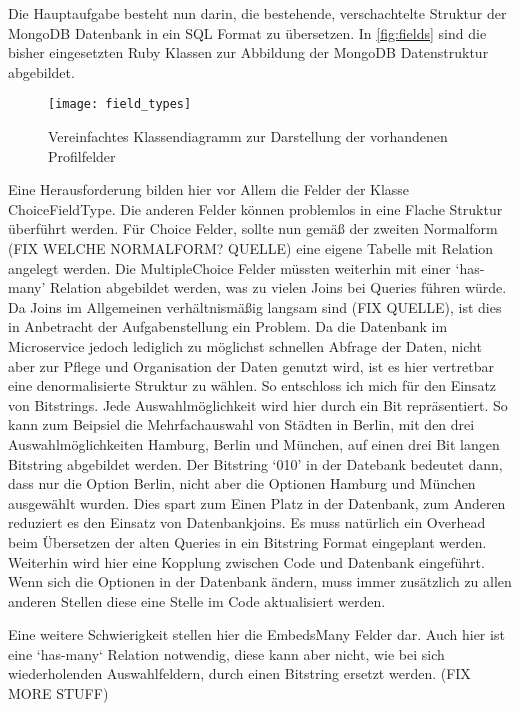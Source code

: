 Die Hauptaufgabe besteht nun darin, die bestehende, verschachtelte Struktur der MongoDB Datenbank in ein SQL Format zu übersetzen.
In \autoref{fig:fields} sind die bisher eingesetzten Ruby Klassen zur Abbildung der MongoDB Datenstruktur abgebildet. 

\begin{figure}[!ht]
    \centering
    \caption{Vereinfachtes Klassendiagramm zur Darstellung der vorhandenen Profilfelder}
    \label{fig:fields}
    \texttt{[image: field\_types]}
\end{figure}

Eine Herausforderung bilden hier vor Allem die Felder der Klasse ChoiceFieldType. Die anderen Felder können problemlos in eine Flache Struktur überführt werden. Für Choice Felder, sollte nun gemäß der zweiten Normalform (FIX WELCHE NORMALFORM? QUELLE) eine eigene Tabelle mit Relation angelegt werden. Die MultipleChoice Felder müssten weiterhin mit einer `has-many' Relation abgebildet werden, was zu vielen Joins bei Queries führen würde. Da Joins im Allgemeinen verhältnismäßig langsam sind (FIX QUELLE), ist dies in Anbetracht der Aufgabenstellung ein Problem. Da die Datenbank im Microservice jedoch lediglich zu möglichst schnellen Abfrage der Daten, nicht aber zur Pflege und Organisation der Daten genutzt wird, ist es hier vertretbar eine denormalisierte Struktur zu wählen. So entschloss ich mich für den Einsatz von Bitstrings. Jede Auswahlmöglichkeit wird hier durch ein Bit repräsentiert. So kann zum Beipsiel die Mehrfachauswahl von Städten in Berlin, mit den drei Auswahlmöglichkeiten Hamburg, Berlin und München, auf einen drei Bit langen Bitstring abgebildet werden. Der Bitstring `010' in der Datebank bedeutet dann, dass nur die Option Berlin, nicht aber die Optionen Hamburg und München ausgewählt wurden. Dies spart zum Einen Platz in der Datenbank, zum Anderen reduziert es den Einsatz von Datenbankjoins. Es muss natürlich ein Overhead beim Übersetzen der alten Queries in ein Bitstring Format eingeplant werden. Weiterhin wird hier eine Kopplung zwischen Code und Datenbank eingeführt. Wenn sich die Optionen in der Datenbank ändern, muss immer zusätzlich zu allen anderen Stellen diese eine Stelle im Code aktualisiert werden.

Eine weitere Schwierigkeit stellen hier die EmbedsMany Felder dar. Auch hier ist eine `has-many` Relation notwendig, diese kann aber nicht, wie bei sich wiederholenden Auswahlfeldern, durch einen Bitstring ersetzt werden. (FIX MORE STUFF)

